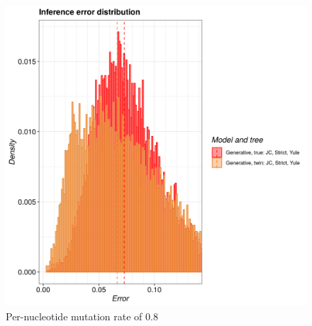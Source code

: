 \begin{figure}[H]
  \includegraphics[width=\textwidth]{pirouette_example_24/example_24_320/errors.png}
  \caption{Per-nucleotide mutation rate of 0.8}
\end{figure}


